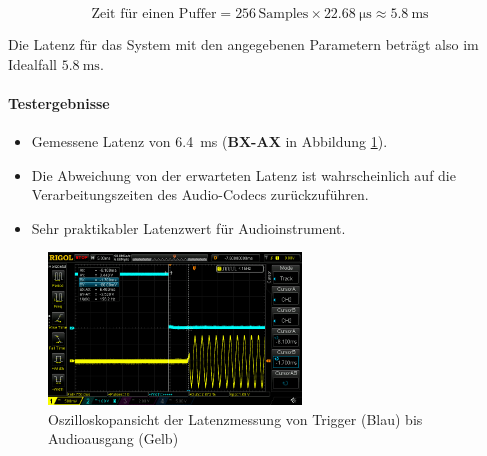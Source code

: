 	\[
	\text{Zeit für einen Puffer} = 256 \, \text{Samples} \times \SI{22.68}{\micro\second} \approx \SI{5.8}{\milli\second}
	\]
	
	Die Latenz für das System mit den angegebenen Parametern beträgt also im Idealfall \( \SI{5.8}{\milli\second} \).
	
\paragraph{Testergebnisse}

\begin{itemize}
	\item Gemessene Latenz von \SI{6.4}{\milli\second} (\textbf{BX-AX} in Abbildung  \ref{fig:audio-latency-test}).
	\item Die Abweichung von der erwarteten Latenz ist wahrscheinlich auf die Verarbeitungszeiten des Audio-Codecs zurückzuführen.
	\item Sehr praktikabler Latenzwert für Audioinstrument.
\end{itemize}

\begin{figure}[H]
	\centering
	\includegraphics[width=0.6\textwidth]{images/10_test_validierung/audio/audio-latency-test.png}
	\caption{Oszilloskopansicht der Latenzmessung von Trigger (Blau) bis Audioausgang (Gelb)}
	\label{fig:audio-latency-test}
\end{figure}